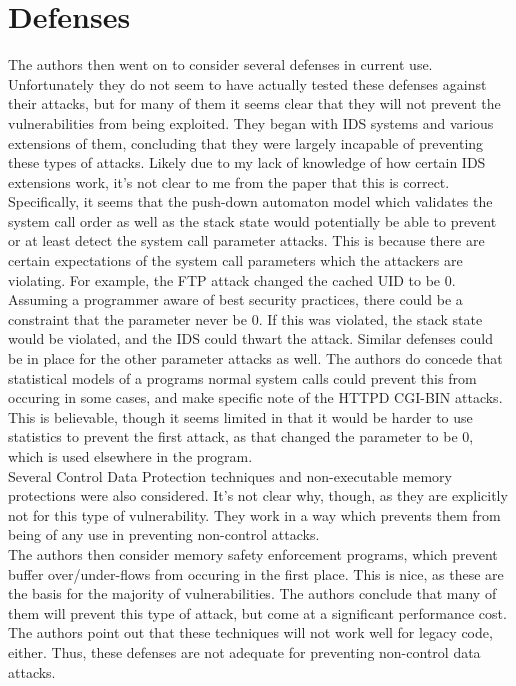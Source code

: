\documentclass{article}
\begin{document}
\section{Defenses}
The authors then went on to consider several defenses in current use.
Unfortunately they do not seem to have actually tested these defenses against their attacks,
but for many of them it seems clear that they will not prevent the vulnerabilities from being exploited.
They began with IDS systems and various extensions of them,
concluding that they were largely incapable of preventing these types of attacks.
Likely due to my lack of knowledge of how certain IDS extensions work,
it's not clear to me from the paper that this is correct.
Specifically, it seems that the push-down automaton model which validates the system call order as well as the stack state would potentially be able to prevent or at least detect the system call parameter attacks.
This is because there are certain expectations of the system call parameters which the attackers are violating.
For example, the FTP attack changed the cached UID to be 0.
Assuming a programmer aware of best security practices,
there could be a constraint that the parameter never be 0.
If this was violated, the stack state would be violated,
and the IDS could thwart the attack.
Similar defenses could be in place for the other parameter attacks as well.
The authors do concede that statistical models of a programs normal system calls could prevent this from occuring in some cases,
and make specific note of the HTTPD CGI-BIN attacks.
This is believable, though it seems limited in that it would be harder to use statistics to prevent the first attack,
as that changed the parameter to be 0, which is used elsewhere in the program.\\
Several Control Data Protection techniques and non-executable memory protections were also considered.
It's not clear why, though, as they are explicitly not for this type of vulnerability.
They work in a way which prevents them from being of any use in preventing non-control attacks.\\
The authors then consider memory safety enforcement programs,
which prevent buffer over/under-flows from occuring in the first place.
This is nice, as these are the basis for the majority of vulnerabilities.
The authors conclude that many of them will prevent this type of attack,
but come at a significant performance cost.
The authors point out that these techniques will not work well for legacy code, either.
Thus, these defenses are not adequate for preventing non-control data attacks.\\
\end{document}
